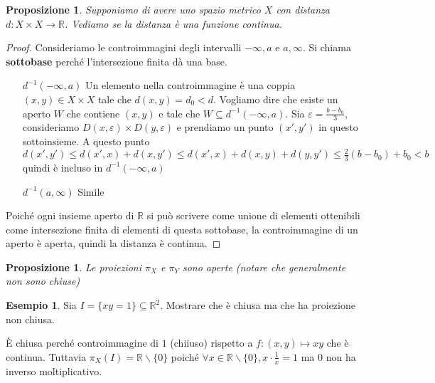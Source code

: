 \documentclass{article}
\newcounter{theo}[section]\setcounter{theo}{0}
\newcounter{excounter}[section]\setcounter{excounter}{0}
\theoremstyle{plain}
\newtheorem{proposition}[theo]{Proposizione}
\theoremstyle{definition}
\newtheorem{example}[excounter]{Esempio}
\theoremstyle{remark}
\begin{document}
\begin{proposition}
    Supponiamo di avere uno spazio metrico \(X\) con distanza \(d: X\times X \to
    \mathbb{R}\). Vediamo se la distanza è una funzione continua.
\end{proposition}
\begin{proof}
    Consideriamo le controimmagini degli intervalli \(-\infty, a\) e \(a,
    \infty\). Si chiama \textbf{sottobase} perché l'intersezione finita dà una
    base.
\begin{itemize}[label = --]
    \item[\(d^{-1}(-\infty, a)\)] Un elemento nella controimmagine è una coppia
        \((x, y) \in X\times X\)  tale che \(d(x,y) = d_{0} < d\). Vogliamo dire
        che esiste un aperto \(W\) che contiene \((x,y)\) e tale che \(W
        \subseteq d^{-1}(-\infty,a) \). Sia \(\varepsilon = \frac{b-b_{0}}{3}\),
        consideriamo \(D(x, \varepsilon) \times D(y, \varepsilon)\) e prendiamo
        un punto \((x', y')\) in questo sottoinsieme. A questo punto \(d(x',
        y')\le d(x', x) + d(x, y') \le d(x',x) + d(x,y)+d(y,y') \le
        \frac{2}{3}(b-b_{0}) + b_{0} < b\) quindi è incluso in
        \(d^{-1}(-\infty,a)\) 
    \item[\(d^{-1}(a, \infty)\) ] Simile
\end{itemize}
    Poiché ogni insieme aperto di \(\mathbb{R}\) si può scrivere come
    unione di elementi ottenibili come intersezione finita di elementi di questa
    sottobase, la controimmagine di un aperto è aperta, quindi la distanza è
    continua.
\end{proof}

\begin{proposition}
    Le proiezioni \(\pi_X\) e \(\pi_Y\) sono aperte (notare che generalmente non
    sono chiuse) 
\end{proposition}
\begin{example}
    Sia \(I = \{xy=1\} \subseteq \mathbb{R}^2\). Mostrare che è chiusa ma che ha
    proiezione non chiusa.

    È chiusa perché controimmagine di \(1\) (chiiuso) rispetto a \(f: (x, y) \mapsto xy\)
    che è continua. Tuttavia \(\pi_X(I) = \mathbb{R} \smallsetminus \{0\} \)
    poiché \(\forall x \in \mathbb{R} \smallsetminus \{0\}, x \cdot \frac{1}{x}
    = 1\) ma 0 non ha inverso moltiplicativo.
\end{example}
\end{document}
